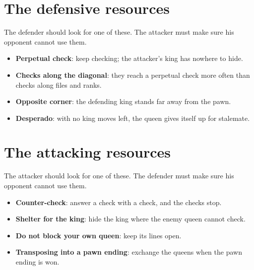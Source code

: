 
\section*{The defensive resources}
The defender should look for one of these. The attacker must make sure his opponent cannot use them.

\begin{itemize}
\item \textbf{Perpetual check}: keep checking; the attacker's king has nowhere to hide.

\item \textbf{Checks along the diagonal}: they reach a perpetual check more often than checks along files and ranks.

\item \textbf{Opposite corner}: the defending king stands far away from the pawn.

\item \textbf{Desperado}: with no king moves left, the queen gives itself up for stalemate.
\end{itemize}

\section*{The attacking resources}
The attacker should look for one of these. The defender must make sure his opponent cannot use them.

\begin{itemize}
\item \textbf{Counter-check}: answer a check with a check, and the checks stop.

\item \textbf{Shelter for the king}: hide the king where the enemy queen cannot check.

\item \textbf{Do not block your own queen}: keep its lines open.

\item \textbf{Transposing into a pawn ending}: exchange the queens when the pawn ending is won.
\end{itemize}

